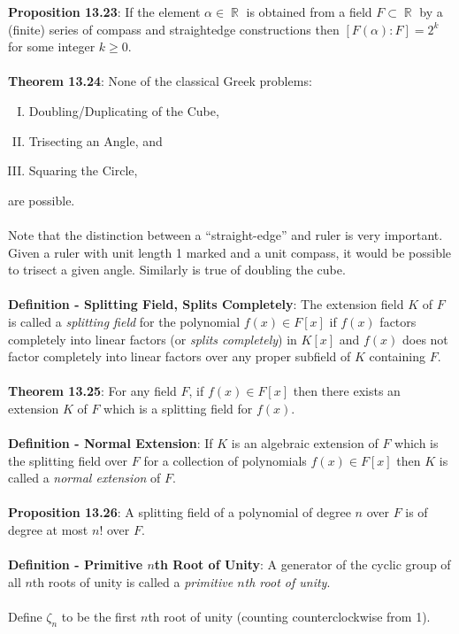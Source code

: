 \documentclass{article}
\DeclareMathOperator{\R}{\mathbb{R}}
\begin{document}
\textbf{Proposition 13.23}: If the element $\alpha \in \R$ is obtained from a field $F \subset \R$ by a (finite) series of compass and straightedge constructions then $[F(\alpha) : F] = 2^k$ for some integer $k \geq 0$. \\ \\
\textbf{Theorem 13.24}: None of the classical Greek problems: \begin{enumerate}[(I)]
    \item Doubling/Duplicating of the Cube, 
    \item Trisecting an Angle, and 
    \item Squaring the Circle,
\end{enumerate} are possible. \\ \\
Note that the distinction between a ``straight-edge'' and ruler is very important. Given a ruler with unit length 1 marked and a unit compass, it would be possible to trisect a given angle. Similarly is true of doubling the cube. \\ \\
\textbf{Definition - Splitting Field, Splits Completely}: The extension field $K$ of $F$ is called a \textit{splitting field} for the polynomial $f(x) \in F[x]$ if $f(x)$ factors completely into linear factors (or \textit{splits completely}) in $K[x]$ and $f(x)$ does not factor completely into linear factors over any proper subfield of $K$ containing $F$. \\ \\
\textbf{Theorem 13.25}: For any field $F$, if $f(x) \in F[x]$ then there exists an extension $K$ of $F$ which is a splitting field for $f(x)$. \\ \\
\textbf{Definition - Normal Extension}: If $K$ is an algebraic extension of $F$ which is the splitting field over $F$ for a collection of polynomials $f(x) \in F[x]$ then $K$ is called a \textit{normal extension} of $F$. \\ \\
\textbf{Proposition 13.26}: A splitting field of a polynomial of degree $n$ over $F$ is of degree at most $n!$ over $F$. \\ \\
\textbf{Definition - Primitive $n$th Root of Unity}: A generator of the cyclic group of all $n$th roots of unity is called a \textit{primitive $n$th root of unity}. \\ \\
Define $\zeta_n$ to be the first $n$th root of unity (counting counterclockwise from 1). \\ \\
\end{document}
